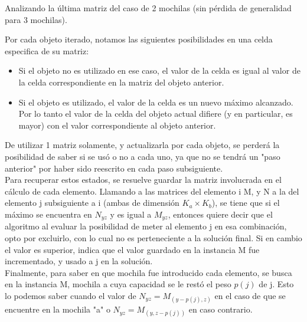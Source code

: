 Analizando la última matriz del caso de 2 mochilas (sin pérdida de generalidad para 3 mochilas). 

Por cada objeto iterado, notamos las siguientes posibilidades en una celda especifica de su matriz:

\begin{itemize}
	\item Si el objeto no es utilizado en ese caso, el valor de la celda es igual al valor de la celda correspondiente en la matriz del objeto anterior.
	\item Si el objeto es utilizado, el valor de la celda es un nuevo m\'aximo alcanzado. Por lo tanto el valor de la celda del objeto actual difiere (y en particular, es mayor) con el valor correspondiente al objeto anterior.
\end{itemize}

De utilizar 1 matriz solamente, y actualizarla por cada objeto, se perderá la posibilidad de saber si se usó o no a cada uno, ya que no se tendrá un "paso anterior" por haber sido reescrito en cada paso subsiguiente. \\


Para recuperar estos estados, se resuelve guardar la matriz involucrada en el c\'alculo de cada elemento. Llamando a las matrices del elemento i M, y N a la del elemento j subsiguiente a i (ambas de dimensión $K_{a} \times K_{b}$), se tiene que si el m\'aximo se encuentra en $N_{yz}$ y es igual a $M_{yz}$, entonces quiere decir que el algoritmo al evaluar la posibilidad de meter al elemento j en esa combinación, opto por excluirlo, con lo cual no es perteneciente a la solución final. Si en cambio el valor es superior, indica que el valor guardado en la instancia M fue incrementado, y usado a j en la solución.\\

Finalmente, para saber en que mochila fue introducido cada elemento, se busca en la instancia M, mochila a cuya capacidad se le restó el peso $p(j)$ de j. Esto lo podemos saber cuando el valor de $N_{yz} = M_{(y-p(j),z)}$ en el caso de que se encuentre en la mochila "a" o $N_{yz} = M_{(y,z-p(j))}$ en caso contrario.\\

